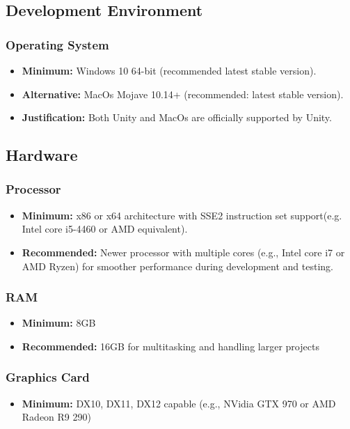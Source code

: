 \subsection{Development Environment}
\subsubsection{Operating System}
\begin{itemize}
	\item \textbf{Minimum:} Windows 10 64-bit (recommended latest stable version).
	\item \textbf{Alternative:} MacOs Mojave 10.14+ (recommended: latest stable version).
	\item \textbf{Justification:} Both Unity and MacOs are officially supported by Unity.
\end{itemize}
\subsection{Hardware}
\subsubsection{Processor}
\begin{itemize}
	\item \textbf{Minimum:} x86 or x64 architecture with SSE2 instruction set support(e.g. Intel core i5-4460 or AMD equivalent).
	\item \textbf{Recommended:} Newer processor with multiple cores (e.g., Intel core i7 or AMD Ryzen) for smoother performance during development and testing.
\end{itemize}
\subsubsection{RAM}
\begin{itemize}
	\item \textbf{Minimum:} 8GB
	\item \textbf{Recommended:} 16GB for multitasking and handling larger projects
\end{itemize}
\subsubsection{Graphics Card}
\begin{itemize}
	\item \textbf{Minimum:} DX10, DX11, DX12 capable (e.g., NVidia GTX 970 or AMD Radeon R9 290)
\end{itemize}
